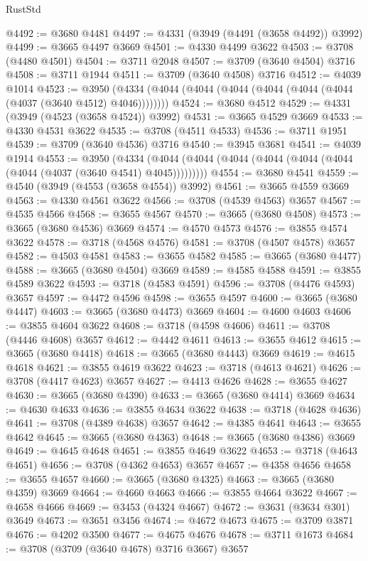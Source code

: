\begin{lexlean}{RustStd}
\begin{coremodule}
@4492 := @3680 @4481
@4497 := @4331 (@3949 (@4491 (@3658 @4492)) @3992)
@4499 := @3665 @4497 @3669
@4501 := @4330 @4499 @3622
@4503 := @3708 (@4480 @4501)
@4504 := @3711 @2048
@4507 := @3709 (@3640 @4504) @3716
@4508 := @3711 @1944
@4511 := @3709 (@3640 @4508) @3716
@4512 := @4039 @1014
@4523 := @3950 (@4334 (@4044 (@4044 (@4044 (@4044 (@4044 (@4044 (@4037 (@3640 @4512) @4046))))))))
@4524 := @3680 @4512
@4529 := @4331 (@3949 (@4523 (@3658 @4524)) @3992)
@4531 := @3665 @4529 @3669
@4533 := @4330 @4531 @3622
@4535 := @3708 (@4511 @4533)
@4536 := @3711 @1951
@4539 := @3709 (@3640 @4536) @3716
@4540 := @3945 @3681
@4541 := @4039 @1914
@4553 := @3950
    (@4334 (@4044 (@4044 (@4044 (@4044 (@4044 (@4044 (@4044 (@4037 (@3640 @4541) @4045)))))))))
@4554 := @3680 @4541
@4559 := @4540 (@3949 (@4553 (@3658 @4554)) @3992)
@4561 := @3665 @4559 @3669
@4563 := @4330 @4561 @3622
@4566 := @3708 (@4539 @4563) @3657
@4567 := @4535 @4566
@4568 := @3655 @4567
@4570 := @3665 (@3680 @4508)
@4573 := @3665 (@3680 @4536) @3669
@4574 := @4570 @4573
@4576 := @3855 @4574 @3622
@4578 := @3718 (@4568 @4576)
@4581 := @3708 (@4507 @4578) @3657
@4582 := @4503 @4581
@4583 := @3655 @4582
@4585 := @3665 (@3680 @4477)
@4588 := @3665 (@3680 @4504) @3669
@4589 := @4585 @4588
@4591 := @3855 @4589 @3622
@4593 := @3718 (@4583 @4591)
@4596 := @3708 (@4476 @4593) @3657
@4597 := @4472 @4596
@4598 := @3655 @4597
@4600 := @3665 (@3680 @4447)
@4603 := @3665 (@3680 @4473) @3669
@4604 := @4600 @4603
@4606 := @3855 @4604 @3622
@4608 := @3718 (@4598 @4606)
@4611 := @3708 (@4446 @4608) @3657
@4612 := @4442 @4611
@4613 := @3655 @4612
@4615 := @3665 (@3680 @4418)
@4618 := @3665 (@3680 @4443) @3669
@4619 := @4615 @4618
@4621 := @3855 @4619 @3622
@4623 := @3718 (@4613 @4621)
@4626 := @3708 (@4417 @4623) @3657
@4627 := @4413 @4626
@4628 := @3655 @4627
@4630 := @3665 (@3680 @4390)
@4633 := @3665 (@3680 @4414) @3669
@4634 := @4630 @4633
@4636 := @3855 @4634 @3622
@4638 := @3718 (@4628 @4636)
@4641 := @3708 (@4389 @4638) @3657
@4642 := @4385 @4641
@4643 := @3655 @4642
@4645 := @3665 (@3680 @4363)
@4648 := @3665 (@3680 @4386) @3669
@4649 := @4645 @4648
@4651 := @3855 @4649 @3622
@4653 := @3718 (@4643 @4651)
@4656 := @3708 (@4362 @4653) @3657
@4657 := @4358 @4656
@4658 := @3655 @4657
@4660 := @3665 (@3680 @4325)
@4663 := @3665 (@3680 @4359) @3669
@4664 := @4660 @4663
@4666 := @3855 @4664 @3622
@4667 := @4658 @4666
@4669 := @3453 (@4324 @4667)
@4672 := @3631 (@3634 @301) @3649
@4673 := @3651 @3456
@4674 := @4672 @4673
@4675 := @3709 @3871
@4676 := @4202 @3500
@4677 := @4675 @4676
@4678 := @3711 @1673
@4684 := @3708 (@3709 (@3640 @4678) @3716 @3667) @3657

\end{coremodule}
\end{lexlean}
